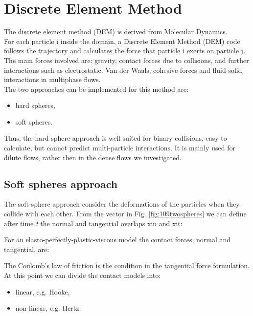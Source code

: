 
\chapter{Discrete Element Method}
\label{cap:dem}

The discrete element method (\acs{DEM}) is derived from Molecular Dynamics. \\ 
For each particle i inside the domain, a Discrete Element Method (\acs{DEM}) code
follows the trajectory and calculates the force that particle i exerts on particle j.
The main forces involved are: gravity, contact forces due to collisions, and
further interactions such as electrostatic, Van der Waals, cohesive forces and fluid-solid interactions in 
multiphase flows. \\
The two approaches can be implemented for this method are:
\begin{itemize}
  \item{hard spheres,}
  \item{soft spheres.}
\end{itemize} 
Thus, the hard-sphere approach is well-suited for binary collisions, easy to
calculate, but cannot predict multi-particle interactions.
It is mainly used for dilute flows, rather then in the dense flows we
investigated.


\section{Soft spheres approach}
\label{sec:softspheresapproach}


The soft-sphere approach consider the deformations of the particles when they
collide with each other. From the vector in Fig. \ref{fig:109twospheres} we can
define after time \textit{t} the normal and tangential overlaps \acs{xin} and
\acs{xit}:


For an elasto-perfectly-plastic-viscous model the contact forces, normal and
tangential, are:


The Coulomb's law of friction is the condition in the tangential force
formulation.
At this point we can divide the contact models into:
\begin{itemize}
  \item{linear, e.g. Hooke,}
  \item{non-linear, e.g. Hertz.}
\end{itemize}

